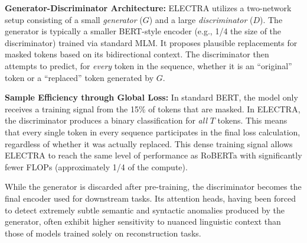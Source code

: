 \documentclass[11pt]{article}
\begin{document}
\textbf{Generator-Discriminator Architecture:} ELECTRA utilizes a two-network setup consisting of a small \emph{generator} ($G$) and a large \emph{discriminator} ($D$). The generator is typically a smaller BERT-style encoder (e.g., 1/4 the size of the discriminator) trained via standard MLM. It proposes plausible replacements for masked tokens based on its bidirectional context. The discriminator then attempts to predict, for \emph{every} token in the sequence, whether it is an ``original'' token or a ``replaced'' token generated by $G$.

\textbf{Sample Efficiency through Global Loss:} In standard BERT, the model only receives a training signal from the 15\% of tokens that are masked. In ELECTRA, the discriminator produces a binary classification for \emph{all} $T$ tokens. This means that every single token in every sequence participates in the final loss calculation, regardless of whether it was actually replaced. This dense training signal allows ELECTRA to reach the same level of performance as RoBERTa with significantly fewer FLOPs (approximately 1/4 of the compute).

While the generator is discarded after pre-training, the discriminator becomes the final encoder used for downstream tasks. Its attention heads, having been forced to detect extremely subtle semantic and syntactic anomalies produced by the generator, often exhibit higher sensitivity to nuanced linguistic context than those of models trained solely on reconstruction tasks.
\end{document}
